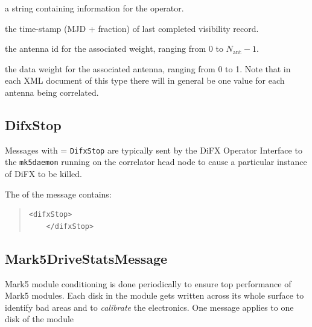 \begin{description}
\begin{description}
\item{} a string containing information for the operator.
\item{} the time-stamp (MJD + fraction) of last completed visibility record.
\item{} the antenna id for the associated weight, ranging from 0 to $N_{\mathrm{ant}}-1$.
\item{} the data weight for the associated antenna, ranging from 0 to 1.
Note that in each XML document of this type there will in general be one  value for each antenna being correlated.
\end{description}








\subsection{DifxStop}

Messages with  = {\tt DifxStop} are typically sent by the DiFX Operator Interface to the {\tt mk5daemon} running on the correlator head node to cause a particular instance of DiFX to be killed.

The  of the message contains:

\begin{quotation}
\begin{Verbatim}[commandchars=\|\[\]]
    <difxStop>
    </difxStop>
\end{Verbatim}
\end{quotation}






\subsection{Mark5DriveStatsMessage}

Mark5 module conditioning is done periodically to ensure top performance of Mark5 modules.
Each disk in the module gets written across its whole surface to identify bad areas and to {\em calibrate} the electronics.
One message applies to one disk of the module


\end{description}
